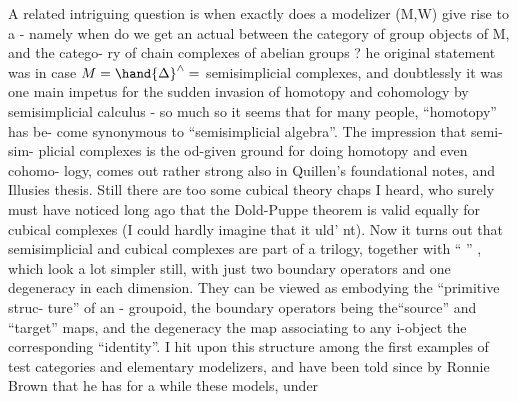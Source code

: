 A related intriguing question is when exactly does a modelizer (M,W)
give rise to a \hand{\uline{\textcolor{black}{Dold-Puppe theorem}}}  -  namely when do we get an actual \hand{\uline{\textcolor{black}{equi-}}}%
\hand{\uline{\textcolor{black}{valence}}} between the category of \hand{\uline{\textcolor{black}{abelian}}} group objects of M,  and the catego-%
ry of chain complexes of abelian groups ?  he original statement was in
case  $M = \hand{\Delta}^{\wedge} =$  semisimplicial complexes,  and doubtlessly it was one main
impetus for the sudden invasion of homotopy and cohomology by semisimplicial
calculus  -  so much so it seems that for many people,  ``homotopy'' has be-%
come synonymous to ``semisimplicial algebra''.  The impression that semi-sim-%
plicial complexes is the od-given ground for doing homotopy and even cohomo-%
logy,  comes out rather strong also in Quillen's foundational notes, and
 Illusies thesis.  Still there are too some cubical theory chaps I heard,
who surely must have noticed long ago that the Dold-Puppe theorem is valid
equally  for cubical complexes (I could hardly imagine that it uld'
 nt).  Now it turns out that semisimplicial and cubical complexes are
part of a trilogy,  together with ``\hand{\uline{\textcolor{black}{hemispherical}}} \hand{\uline{\textcolor{black}{complexes}}}'' ,  which look
a lot simpler still,  with just two boundary operators and one degeneracy
in each dimension.  They can be viewed as  embodying the ``primitive struc-%
ture'' of an \hand{$\infty$}- groupoid,  the boundary operators being the``source'' and
``target'' maps,  and the degeneracy the map associating to any i-object the
corresponding ``identity''.  \hand{(} I hit upon this structure among the first
examples of test categories and elementary modelizers,  and have been told
since by Ronnie Brown that he has  for a while these models,  under

